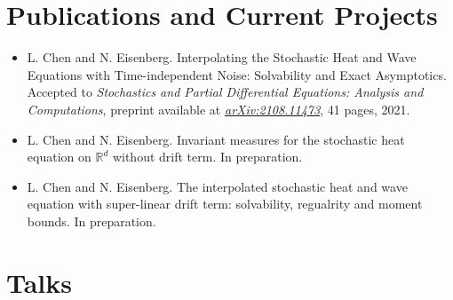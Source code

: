 \documentclass[letterpaper,12pt]{article}
\begin{document}

 
 \section{Publications and Current Projects}
 
\begin{itemize}[itemsep = -2pt, topsep=0pt]
\item \noindent L. Chen and N. Eisenberg. Interpolating the Stochastic Heat and Wave Equations with Time-independent Noise:
Solvability and Exact Asymptotics. Accepted to {\em Stochastics and Partial Differential Equations: Analysis and Computations}, preprint available at \href{https://arxiv.org/abs/2108.11473}{\textit{arXiv:2108.11473}}, 41 pages, 2021.

\item \noindent L. Chen and N. Eisenberg. Invariant measures for the stochastic heat equation on $\mathbb{R}^d$ without drift term. In preparation.

\item \noindent L. Chen and N. Eisenberg. The interpolated stochastic heat and wave equation with super-linear drift term: solvability, regualrity and moment bounds. In preparation.

\end{itemize}
 \section{Talks}
 
\end{document}
